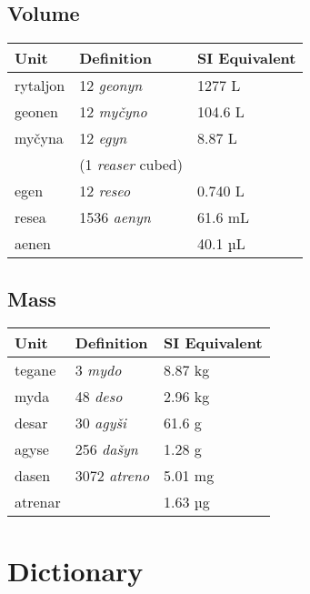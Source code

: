 \documentclass{book}
\begin{document}
\section{Volume}

\begin{table}[H]
  \centering
	\begin{tabular}{|l|l|l|}
		\hline
		Unit & Definition & SI Equivalent \\ \hline
		rytaljon & 12 \emph{geonyn} & 1277 L \\
		geonen & 12 \emph{myčyno} & 104.6 L \\
		myčyna & 12 \emph{egyn} & 8.87 L \\
		& (1 \emph{reaser} cubed) & \\
		egen & 12 \emph{reseo} & 0.740 L \\
		resea & 1536 \emph{aenyn} & 61.6 mL \\
		aenen & & 40.1 µL \\ \hline
	\end{tabular}
\end{table}

\section{Mass}

\begin{table}[H]
  \centering
	\begin{tabular}{|l|l|l|}
		\hline
		Unit & Definition & SI Equivalent \\ \hline
		tegane & 3 \emph{mydo} & 8.87 kg \\
		myda & 48 \emph{deso} & 2.96 kg \\
		desar & 30 \emph{agyši} & 61.6 g \\
		agyse & 256 \emph{dašyn} & 1.28 g \\
		dasen & 3072 \emph{atreno} & 5.01 mg \\
		atrenar & & 1.63 µg \\ \hline
	\end{tabular}
\end{table}

\appendix

\chapter{Dictionary}

\begin{multicols}{2}
    
\end{multicols}
\end{document}
